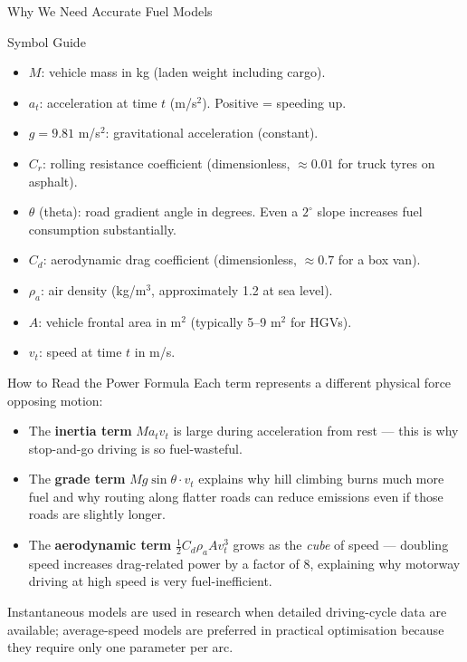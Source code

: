 \documentclass[aspectratio=169,10pt]{beamer}
\begin{document}
\begin{frame}[allowframebreaks]{Why We Need Accurate Fuel Models}
  \begin{block}{Symbol Guide}
    \begin{itemize}
      \item $M$: vehicle mass in kg (laden weight including cargo).
      \item $a_t$: acceleration at time $t$ (m/s$^2$).  Positive = speeding up.
      \item $g = 9.81$ m/s$^2$: gravitational acceleration (constant).
      \item $C_r$: rolling resistance coefficient (dimensionless, $\approx 0.01$
      for truck tyres on asphalt).
      \item $\theta$ (theta): road gradient angle in degrees.  Even a $2^\circ$
      slope increases fuel consumption substantially.
      \item $C_d$: aerodynamic drag coefficient (dimensionless, $\approx 0.7$
      for a box van).
      \item $\rho_a$: air density (kg/m$^3$, approximately 1.2 at sea level).
      \item $A$: vehicle frontal area in m$^2$ (typically 5--9 m$^2$ for HGVs).
      \item $v_t$: speed at time $t$ in m/s.
    \end{itemize}
  \end{block}

  \framebreak

  \begin{alertblock}{How to Read the Power Formula}
    Each term represents a different physical force opposing motion:
    \begin{itemize}
      \item The \textbf{inertia term} $M a_t v_t$ is large during acceleration
      from rest --- this is why stop-and-go driving is so fuel-wasteful.
      \item The \textbf{grade term} $Mg\sin\theta \cdot v_t$ explains why
      hill climbing burns much more fuel and why routing along flatter roads
      can reduce emissions even if those roads are slightly longer.
      \item The \textbf{aerodynamic term} $\frac{1}{2}C_d\rho_a A v_t^3$
      grows as the \emph{cube} of speed --- doubling speed increases drag-related
      power by a factor of 8, explaining why motorway driving at high speed is
      very fuel-inefficient.
    \end{itemize}
    Instantaneous models are used in research when detailed driving-cycle data
    are available; average-speed models are preferred in practical optimisation
    because they require only one parameter per arc.
  \end{alertblock}


\end{frame}
\end{document}

